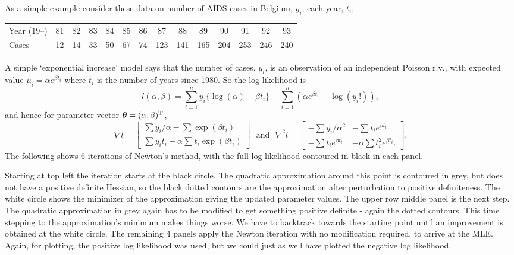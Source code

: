 \documentclass[10pt] {article}
\newcommand{\grad}{\nabla}
\newcommand{\ts}{^{\rm T}}
\newcommand{\bmat}[1]{\left [ \begin{array}{#1}}
\newcommand{\emat}{\end{array}\right ]}
\newcommand{\eps}[3]
{{\begin{center}
 \rotatebox{#1}{\scalebox{#2}{\texttt{[image: \#3]}}}
 \end{center}}
}
\theoremstyle{definition}
\begin{document}
As a simple example consider these data on number of AIDS cases in Belgium, $y_i$, each year, $t_i$,  

\bigskip

{ \noindent\tabcolsep=0.11cm \begin{tabular}{l|ccccccccccccc}
Year (19--)& 81 & 82 & 83 & 84 & 85 & 86 & 87 & 88 & 89 & 90 & 91 & 92 & 93\\
Cases   & 12 & 14 & 33 & 50 & 67 & 74 & 123& 141& 165& 204& 253& 246& 240
\end{tabular}}

\bigskip

\noindent A simple `exponential increase' model says that the number of cases, $y_i$, is an observation of an independent Poisson r.v., with expected value
$ \mu_i = \alpha e^{\beta t_i} $
where $t_i$ is the number of years since 1980. So  the log likelihood is
$$
l(\alpha,\beta) = \sum_{i=1}^n y_i \{\log(\alpha) + \beta t_i\} - \sum_{i=1}^n ( \alpha e^{\beta t_i} - \log (y_i!) ),
$$
and hence for parameter vector ${\bm \theta} = (\alpha, \beta)\ts$,
$$
\grad l =
\bmat{c} \sum y_i / \alpha - \sum \exp(\beta t_i) \\
\sum y_i t_i - \alpha \sum t_i \exp(\beta t_i)
\emat  \text{~~and~~}
\grad^2 l =
\bmat{cc}
- \sum y_i / \alpha^2 & - \sum t_i e^{\beta t_i} \\
- \sum t_i e^{\beta t_i} & - \alpha \sum t_i^2 e^{\beta t_i}.
\emat.
$$
The following shows 6 iterations of Newton's method, with the full log likelihood contoured in black in each panel.

\eps{-90}{.5}{newton-aids.eps}

Starting at top left the iteration starts at the black circle. The quadratic approximation around this point is contoured in grey, but does not have a positive definite Hessian, so the black dotted contours are the approximation after perturbation to positive definiteness. The white circle shows the minimizer of the approximation giving the updated parameter values. The upper row middle panel is the next step. The quadratic approximation in grey again has to be modified to get something positive definite - again the dotted contours. This time stepping to the approximation's minimum makes things worse. We have to backtrack towards the starting point until an improvement is obtained at the white circle. The remaining 4 panels apply the Newton iteration with no modification required, to arrive at the MLE. Again, for plotting, the positive log likelihood was used, but we could just as well have plotted the negative log likelihood. 
\end{document}
